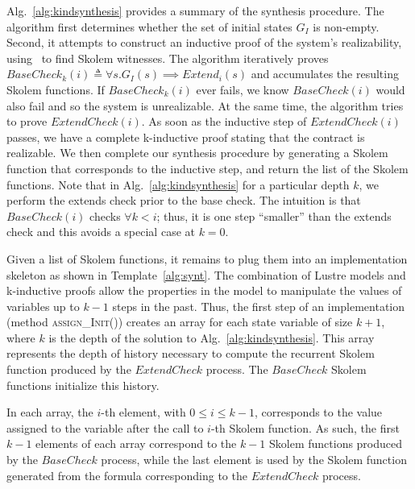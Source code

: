 Alg.~\ref{alg:kindsynthesis} provides a summary of the synthesis
procedure. The algorithm first determines whether the set of initial states $G_I$ is non-empty.
Second, it attempts to construct an inductive proof of the system's
realizability, using \aeval\ to find Skolem witnesses.  The algorithm
iteratively proves $\mathit{BaseCheck_k(i)} \triangleq \forall s. G_I(s) \implies \mathit{Extend}_i(s)$ and
accumulates the resulting Skolem functions. If
$\mathit{BaseCheck_k(i)}$ ever fails, we know $\mathit{BaseCheck(i)}$
would also fail and so the system is unrealizable. At the same time,
the algorithm tries to prove $\mathit{ExtendCheck(i)}$. As soon as the
inductive step of $\mathit{ExtendCheck(i)}$ passes, we have a complete
k-inductive proof stating that the contract is realizable. We then
complete our synthesis procedure by generating a Skolem function that
corresponds to the inductive step, and return the list of the Skolem
functions.  Note that in Alg.~\ref{alg:kindsynthesis} for a particular depth $k$,
we perform the extends check prior to the base check.
The intuition is that $\mathit{BaseCheck(i)}$ checks
$\forall k < i$; thus, it is one step ``smaller'' than the extends
check and this avoids a special case at $k=0$.

Given a list of Skolem functions, it remains to plug them into
an implementation skeleton as shown in Template~\ref{alg:synt}.
The combination of Lustre models and k-inductive proofs
allow the properties in the model to manipulate the
 values of variables up to $k-1$ steps in the past. Thus,
the first step of an implementation  (method \textsc{assign\_Init()})
 creates an array for each state variable of size $k+1$, where
$k$ is the depth of the solution to Alg.~\ref{alg:kindsynthesis}.
This array represents the depth of history necessary to compute
the recurrent Skolem function produced by the $\mathit{ExtendCheck}$ process.
The $\mathit{BaseCheck}$ Skolem functions initialize this history.

In each array, the $i$-th element, with $0\leq i \leq k-1$,
corresponds to the value assigned to the variable after the call to
$i$-th Skolem function. As such, the first $k-1$ elements of each array
correspond to the $k-1$ Skolem functions produced by the
$\mathit{BaseCheck}$ process, while the last element is used by the
Skolem function generated from the formula corresponding to the
$\mathit{ExtendCheck}$ process.

